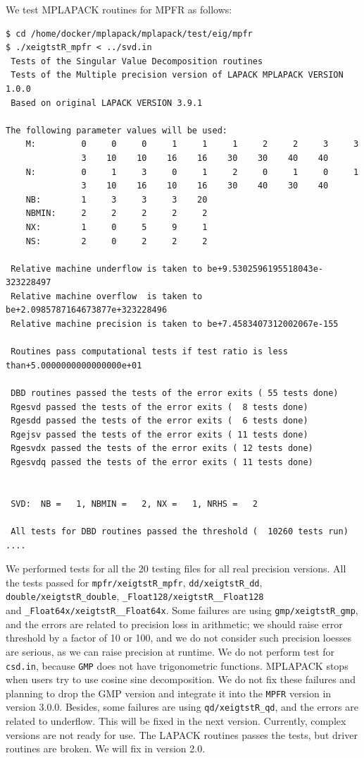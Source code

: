 \documentclass[12pt]{article}
\begin{document}
We test MPLAPACK routines for MPFR as follows:
\begin{verbatim}
$ cd /home/docker/mplapack/mplapack/test/eig/mpfr
$ ./xeigtstR_mpfr < ../svd.in
 Tests of the Singular Value Decomposition routines
 Tests of the Multiple precision version of LAPACK MPLAPACK VERSION 1.0.0
 Based on original LAPACK VERSION 3.9.1

The following parameter values will be used:
    M:         0     0     0     1     1     1     2     2     3     3
               3    10    10    16    16    30    30    40    40
    N:         0     1     3     0     1     2     0     1     0     1
               3    10    16    10    16    30    40    30    40
    NB:        1     3     3     3    20
    NBMIN:     2     2     2     2     2
    NX:        1     0     5     9     1
    NS:        2     0     2     2     2

 Relative machine underflow is taken to be+9.5302596195518043e-323228497
 Relative machine overflow  is taken to be+2.0985787164673877e+323228496
 Relative machine precision is taken to be+7.4583407312002067e-155

 Routines pass computational tests if test ratio is less than+5.0000000000000000e+01

 DBD routines passed the tests of the error exits ( 55 tests done)
 Rgesvd passed the tests of the error exits (  8 tests done)
 Rgesdd passed the tests of the error exits (  6 tests done)
 Rgejsv passed the tests of the error exits ( 11 tests done)
 Rgesvdx passed the tests of the error exits ( 12 tests done)
 Rgesvdq passed the tests of the error exits ( 11 tests done)


 SVD:  NB =   1, NBMIN =   2, NX =   1, NRHS =   2

 All tests for DBD routines passed the threshold (  10260 tests run)
....
\end{verbatim}
We performed tests for all the 20 testing files for all real precision versions. 
All the tests passed for {\tt mpfr/xeigtstR\_mpfr}, {\tt dd/xeigtstR\_dd}, {\tt double/xeigtstR\_double},  
 {\tt \_Float128/xeigtstR\_\_Float128} \\
 and {\tt \_Float64x/xeigtstR\_\_Float64x}.
Some failures are using {\tt gmp/xeigtstR\_gmp}, and the errors are related to precision loss in arithmetic; we should raise error threshold by a factor of 10 or 100, and we do not consider such precision loesses are serious,
as we can raise precision at runtime.
We do not perform test for {\tt csd.in}, because {\tt GMP} does not have trigonometric functions. MPLAPACK stops
when users try to use cosine sine decomposition.
We do not fix these failures and planning to drop the GMP version and integrate it into the {\tt MPFR} version in version 3.0.0.  
Besides, some failures are using {\tt qd/xeigtstR\_qd}, and the errors are related to underflow. This will be fixed
in the next version. Currently, complex versions are not ready for use. The LAPACK routines passes the tests, but driver routines are broken. We will fix in version 2.0.
\end{document}
